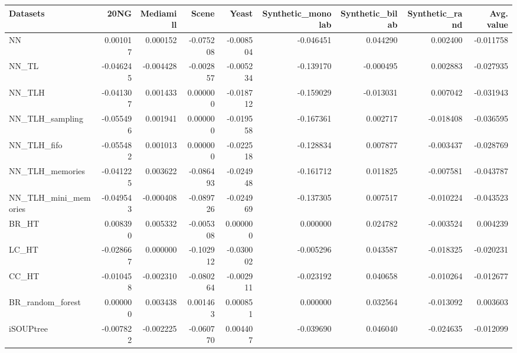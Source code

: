 \begin{tabular}{lrrrrrrrr}
\toprule
Datasets &      20NG &  Mediamill &     Scene &     Yeast &  Synthetic\_monolab &  Synthetic\_bilab &  Synthetic\_rand &  Avg. value \\
\midrule
NN                   &  0.001017 &   0.000152 & -0.075208 & -0.008504 &          -0.046451 &         0.044290 &        0.002400 &   -0.011758 \\
NN\_TL                & -0.046245 &  -0.004428 & -0.002857 & -0.005234 &          -0.139170 &        -0.000495 &        0.002883 &   -0.027935 \\
NN\_TLH               & -0.041307 &   0.001433 &  0.000000 & -0.018712 &          -0.159029 &        -0.013031 &        0.007042 &   -0.031943 \\
NN\_TLH\_sampling      & -0.055496 &   0.001941 &  0.000000 & -0.019558 &          -0.167361 &         0.002717 &       -0.018408 &   -0.036595 \\
NN\_TLH\_fifo          & -0.055482 &   0.001013 &  0.000000 & -0.022518 &          -0.128834 &         0.007877 &       -0.003437 &   -0.028769 \\
NN\_TLH\_memories      & -0.041225 &   0.003622 & -0.086493 & -0.024948 &          -0.161712 &         0.011825 &       -0.007581 &   -0.043787 \\
NN\_TLH\_mini\_memories & -0.049543 &  -0.000408 & -0.089726 & -0.024969 &          -0.137305 &         0.007517 &       -0.010224 &   -0.043523 \\
BR\_HT                &  0.008390 &   0.005332 & -0.005308 &  0.000000 &           0.000000 &         0.024782 &       -0.003524 &    0.004239 \\
LC\_HT                & -0.028667 &   0.000000 & -0.102912 & -0.030002 &          -0.005296 &         0.043587 &       -0.018325 &   -0.020231 \\
CC\_HT                & -0.010458 &  -0.002310 & -0.080264 & -0.002911 &          -0.023192 &         0.040658 &       -0.010264 &   -0.012677 \\
BR\_random\_forest     &  0.000000 &   0.003438 &  0.001463 &  0.000851 &           0.000000 &         0.032564 &       -0.013092 &    0.003603 \\
iSOUPtree            & -0.007822 &  -0.002225 & -0.060770 &  0.004407 &          -0.039690 &         0.046040 &       -0.024635 &   -0.012099 \\
\bottomrule
\end{tabular}
